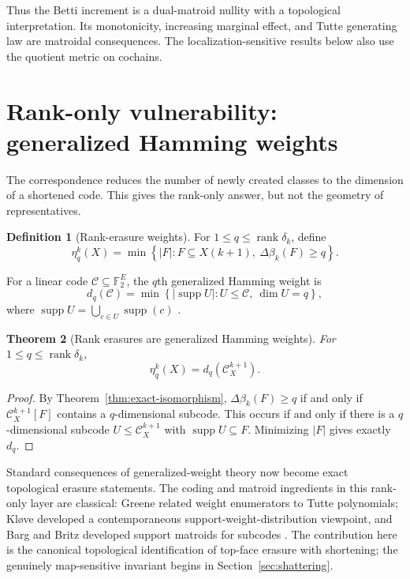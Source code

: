 \documentclass[11pt,letterpaper]{article}
\theoremstyle{plain}
\newtheorem{theorem}{Theorem}[section]
\theoremstyle{definition}
\newtheorem{definition}[theorem]{Definition}
\newcommand{\F}{\mathbb{F}_2}
\newcommand{\cC}{\mathcal{C}}
\newcommand{\supp}{\operatorname{supp}}
\newcommand{\rank}{\operatorname{rank}}
\newcommand{\1}{\mathbf{1}}
\newcommand{\abs}[1]{\left|#1\right|}
\newcommand{\set}[1]{\left\{#1\right\}}
\begin{document}
Thus the Betti increment is a dual-matroid nullity with a topological
interpretation.  Its monotonicity, increasing marginal effect, and Tutte generating
law are matroidal consequences.  The localization-sensitive results below also use
the quotient metric on cochains.

\section{Rank-only vulnerability: generalized Hamming weights}\label{sec:rank}

The correspondence reduces the number of newly created classes to the dimension of
a shortened code.  This gives the rank-only answer, but not the geometry of
representatives.


\begin{definition}[Rank-erasure weights]\label{def:eta}
For $1\le q\le \rank\delta_k$, define
\begin{equation}\label{eq:eta}
 \eta_q^k(X)=\min\set{\abs{F}:F\subseteq X(k+1),\ \Delta\beta_k(F)\ge q}.
\end{equation}
\end{definition}

For a linear code $\cC\subseteq\F^E$, the $q$th generalized Hamming weight is
\[
 d_q(\cC)=\min\set{\abs{\supp U}:U\le\cC,\ \dim U=q},
\]
where $\supp U=\bigcup_{c\in U}\supp(c)$ \cite{wei1991}.

\begin{theorem}[Rank erasures are generalized Hamming weights]
\label{thm:eta-generalized-weight}
For $1\le q\le\rank\delta_k$,
\begin{equation}\label{eq:eta-dq}
 \eta_q^k(X)=d_q(\cC_X^{k+1}).
\end{equation}
\end{theorem}

\begin{proof}
By Theorem~\ref{thm:exact-isomorphism}, $\Delta\beta_k(F)\ge q$ if and only if
$\cC_X^{k+1}[F]$ contains a $q$-dimensional subcode.  This occurs if and only if there
is a $q$-dimensional subcode $U\le\cC_X^{k+1}$ with $\supp U\subseteq F$.  Minimizing
$\abs{F}$ gives exactly $d_q$.
\end{proof}

Standard consequences of generalized-weight theory now become exact topological erasure
statements.  The coding and matroid ingredients in this rank-only layer are classical:
Greene related weight enumerators to Tutte polynomials; Kl{\o}ve developed a
contemporaneous support-weight-distribution viewpoint, and Barg and Britz developed
support matroids for subcodes \cite{greene1976,klove1992,barg1997,britz2007,wei1991}.
The contribution here is the canonical
topological identification of top-face erasure with shortening; the genuinely
map-sensitive invariant begins in Section~\ref{sec:shattering}.
\end{document}
